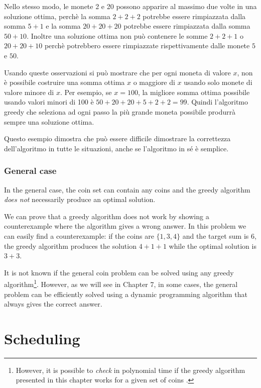 Nello stesso modo, le monete 2 e 20 possono apparire al massimo due 
volte in una soluzione ottima, perchè la somma $2+2+2$ potrebbe essere
rimpiazzata dalla somma $5+1$ e la somma $20+20+20$ potrebbe essere rimpiazzata
dalla somma $50+10$.
Inoltre una soluzione ottima non può contenere le somme
$2+2+1$ o $20+20+10$ perchè potrebbero essere 
rimpiazzate rispettivamente dalle
monete $5$ e $50$.

Usando queste osservazioni 
si può mostrare che per ogni moneta di valore $x$,
non è possibile costruire una somma ottima $x$ o maggiore di $x$
usando solo monete di valore minore di $x$.
Per esempio, se $x=100$, la migliore somma ottima possibile
usando valori minori di 100 è $50+20+20+5+2+2=99$.
Quindi l'algoritmo greedy che seleziona ad ogni passo la più
grande moneta possibile produrrà sempre una soluzione ottima.

Questo esempio dimostra che può essere difficile
dimostrare la correttezza dell'algoritmo in tutte le situazioni,
anche se l'algoritmo in sé è semplice. 

\subsubsection{General case}

In the general case, the coin set can contain any coins
and the greedy algorithm \emph{does not} necessarily produce
an optimal solution.

We can prove that a greedy algorithm does not work
by showing a counterexample
where the algorithm gives a wrong answer.
In this problem we can easily find a counterexample:
if the coins are $\{1,3,4\}$ and the target sum
is 6, the greedy algorithm produces the solution
$4+1+1$ while the optimal solution is $3+3$.

It is not known if the general coin problem
can be solved using any greedy algorithm\footnote{However, it is possible
to \emph{check} in polynomial time
if the greedy algorithm presented in this chapter works for
a given set of coins \cite{pea05}.}.
However, as we will see in Chapter 7,
in some cases,
the general problem can be efficiently
solved using a dynamic
programming algorithm that always gives the
correct answer.

\section{Scheduling}

